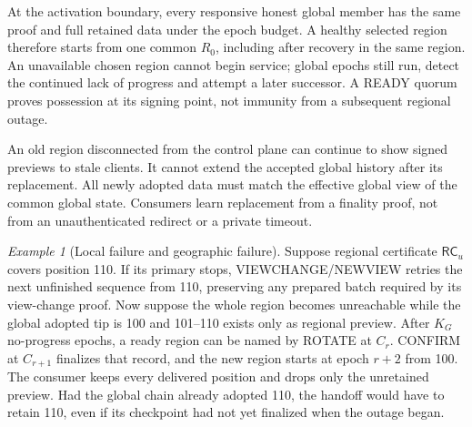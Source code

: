 \documentclass[11pt,a4paper,onecolumn]{article}
\newcommand{\RC}{\mathsf{RC}}
\theoremstyle{remark}\newtheorem{example}[definition]{Example}
\begin{document}
At the activation boundary, every responsive honest global member has the
same proof and full retained data under the epoch budget. A healthy selected
region therefore starts from one common $R_0$, including after recovery in the
same region. An unavailable chosen region
cannot begin service; global epochs still run, detect the continued lack of
progress and attempt a later successor. A READY quorum proves possession at
its signing point, not immunity from a subsequent regional outage.

An old region disconnected from the control plane can continue to show signed
previews to stale clients. It cannot extend the accepted global history after
its replacement. All newly adopted data must match the effective global view
of the common global state. Consumers learn replacement from a finality proof,
not from an unauthenticated redirect or a private timeout.

\begin{example}[Local failure and geographic failure]
Suppose regional certificate $\RC_u$ covers position 110. If its primary stops,
VIEWCHANGE/NEWVIEW retries the next unfinished sequence from 110, preserving
any prepared batch required by its view-change proof. Now suppose the whole region becomes unreachable while the global
adopted tip is 100 and 101--110 exists only as regional preview. After $K_G$
no-progress epochs, a ready region can be named by ROTATE at $C_r$. CONFIRM at
$C_{r+1}$ finalizes that record, and the new region starts at epoch $r+2$ from
100. The consumer keeps every delivered position and drops only the unretained
preview. Had the global chain already adopted 110, the handoff would have to
retain 110, even if its checkpoint had not yet finalized when the outage began.
\end{example}

\end{document}
